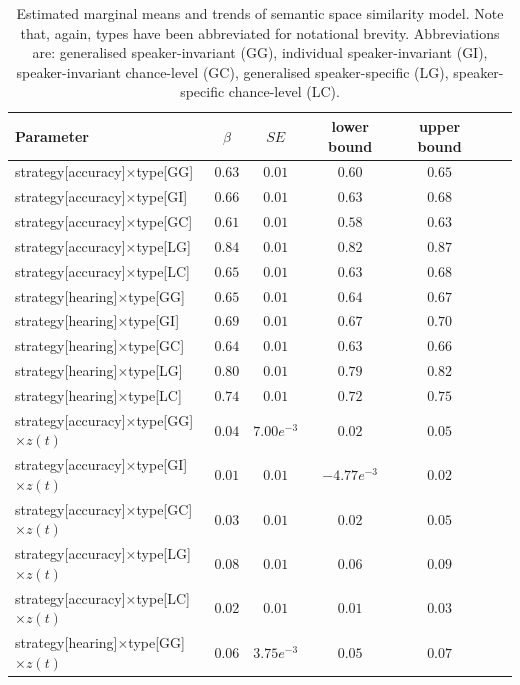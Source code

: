 \documentclass[pdflatex,sn-mathphys]{sn-jnl}
\begin{document}
\begin{table}[h]
\begin{center}
\begin{minipage}{\textwidth}
\caption{Estimated marginal means and trends of semantic space similarity model. Note that, again, types have been abbreviated for notational brevity. Abbreviations are: generalised speaker-invariant (GG), individual speaker-invariant (GI), speaker-invariant chance-level (GC), generalised speaker-specific (LG), speaker-specific chance-level (LC).}\label{tab8}
\begin{tabular*}{\textwidth}{@{\extracolsep{\fill}}lcccccc@{\extracolsep{\fill}}}
\toprule%
Parameter & $\beta$ & $SE$ & lower bound & upper bound \\
\midrule
strategy[accuracy]$\times$type[GG] & $0.63$ & $0.01$ & $0.60$ & $0.65$ \\
strategy[accuracy]$\times$type[GI] & $0.66$ & $0.01$ & $0.63$ & $0.68$ \\
strategy[accuracy]$\times$type[GC] & $0.61$ & $0.01$ & $0.58$ & $0.63$ \\
strategy[accuracy]$\times$type[LG] & $0.84$ & $0.01$ & $0.82$ & $0.87$ \\
strategy[accuracy]$\times$type[LC] & $0.65$ & $0.01$ & $0.63$ & $0.68$ \\
strategy[hearing]$\times$type[GG] & $0.65$ & $0.01$ & $0.64$ & $0.67$ \\
strategy[hearing]$\times$type[GI] & $0.69$ & $0.01$ & $0.67$ & $0.70$ \\
strategy[hearing]$\times$type[GC] & $0.64$ & $0.01$ & $0.63$ & $0.66$ \\
strategy[hearing]$\times$type[LG] & $0.80$ & $0.01$ & $0.79$ & $0.82$ \\
strategy[hearing]$\times$type[LC] & $0.74$ & $0.01$ & $0.72$ & $0.75$ \\
strategy[accuracy]$\times$type[GG]$\times z(t)$ & $0.04$ & $7.00e^{-3}$ & $0.02$ & $0.05$ \\
strategy[accuracy]$\times$type[GI]$\times z(t)$ & $0.01$ & $0.01$ & $-4.77e^{-3}$ & $0.02$ \\
strategy[accuracy]$\times$type[GC]$\times z(t)$ & $0.03$ & $0.01$ & $0.02$ & $0.05$ \\
strategy[accuracy]$\times$type[LG]$\times z(t)$ & $0.08$ & $0.01$ & $0.06$ & $0.09$ \\
strategy[accuracy]$\times$type[LC]$\times z(t)$ & $0.02$ & $0.01$ & $0.01$ & $0.03$ \\
strategy[hearing]$\times$type[GG]$\times z(t)$ & $0.06$ & $3.75e^{-3}$ & $0.05$ & $0.07$ \\

\end{tabular*}
\end{minipage}
\end{center}
\end{table}
\end{document}

